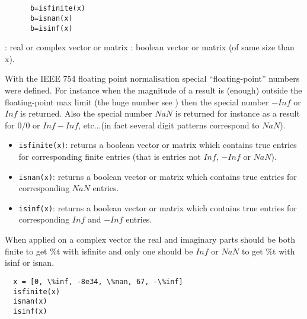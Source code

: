 

\begin{mandesc}
\\
\\
\end{mandesc}

\begin{calling_sequence}
\begin{verbatim}
      b=isfinite(x)  
      b=isnan(x)  
      b=isinf(x)  
\end{verbatim}
\end{calling_sequence}

\begin{parameters}
  \begin{varlist}
    : real or complex vector or matrix
    : boolean vector or matrix (of same size than x).
  \end{varlist}
\end{parameters}
\begin{mandescription}
  With the IEEE 754 floating point normalisation special ``floating-point''
  numbers were defined. For instance when the magnitude of a result is (enough)
  outside the floating-point max limit (the huge number see
  ) then the special number
  $-Inf$ or $Inf$ is returned. Also the special number $NaN$ is returned for
  instance as a result for $0 / 0$ or $Inf - Inf$, etc...(in fact several digit
  patterns correspond to $NaN$).
  \begin{itemize}
  \item \verb!isfinite(x)!: returns a boolean vector or matrix which contains true
    entries for corresponding finite entries (that is entries not $Inf$, $-Inf$ or
    $NaN$).
  \item \verb!isnan(x)!: returns a boolean vector or matrix which contains true
    entries for corresponding $NaN$ entries.
  \item \verb!isinf(x)!: returns a boolean vector or matrix which contains true
    entries for corresponding $Inf$ and $-Inf$ entries.
  \end{itemize}
  When applied on a complex vector the real and imaginary parts should
  be both finite to get \%t with isfinite and only one should be $Inf$
  or $NaN$ to get \%t with isinf or isnan. 
\end{mandescription}
\begin{examples}
\begin{Verbatim}
  x = [0, \%inf, -8e34, \%nan, 67, -\%inf]
  isfinite(x)
  isnan(x)
  isinf(x)
\end{Verbatim}
\end{examples}
\begin{manseealso}
\end{manseealso}

